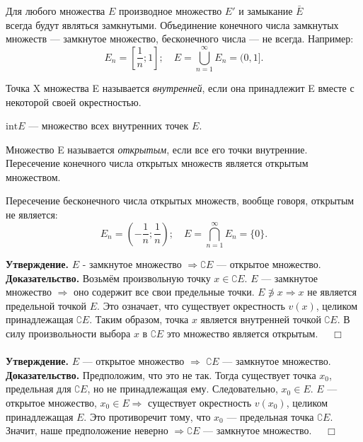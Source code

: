 \documentclass[12pt,a4paper, titlepage]{article}
\begin{document}
Для любого множества $E$ производное множество $E'$ и замыкание $\bar E$\\ всегда будут являться замкнутыми. 
Объединение конечного числа замкнутых множеств --- замкнутое множество, бесконечного числа --- не всегда. Например:
$$
E_n = \left[\frac 1 n ; 1\right]; \quad E = \bigcup^{\infty}_{n=1} E_n = (0, 1].
$$

Точка X множества E называется \textit{внутренней}, если она принадлежит E вместе с некоторой своей окрестностью.

$\mathrm{int}E$ --- множество всех внутренних точек $E$.

Множество E называется \textit{открытым}, если все его точки внутренние.\\

Пересечение конечного числа открытых множеств является открытым множеством.

Пересечение бесконечного числа открытых множеств, вообще говоря, открытым не является:
$$
E_n = \left(- \frac 1 n ; \frac 1 n \right); \quad E = \bigcap^{\infty}_{n=1} E_n = \{0\}.
$$

\textbf{Утверждение.} $E$ - замкнутое множество $\Rightarrow \complement E$ --- открытое множество.\\
\textbf{Доказательство.}
Возьмём произвольную точку $x \in \complement E$. $E$ --- замкнутое множество $\Rightarrow$ оно содержит все свои предельные точки. $E \not\ni x \Rightarrow x$ не является предельной точкой $E$. Это означает, что существует окрестность $v(x)$, целиком принадлежащая $\complement E$. Таким образом, точка $x$ является внутренней точкой $\complement E$. В силу произвольности выбора $x$ в $\complement E$ это множество является открытым. $\quad \Box$\\ \\

\textbf{Утверждение.} $E$ --- открытое множество $\Rightarrow$ $\complement E$ --- замкнутое множество.\\
\textbf{Доказательство.}
Предположим, что это не так. Тогда существует точка $x_0$, предельная для $\complement E$, но не принадлежащая ему. Следовательно, $x_0 \in E$. $E$ --- открытое множество, $x_0 \in E \Rightarrow$ существует окрестность $v(x_0)$, целиком принадлежащая $E$. Это противоречит тому, что $x_0$ --- предельная точка $\complement E$. Значит, наше предположение неверно $\Rightarrow \complement E$ --- замкнутое множество. $\quad \Box$\\ \\
\end{document}
